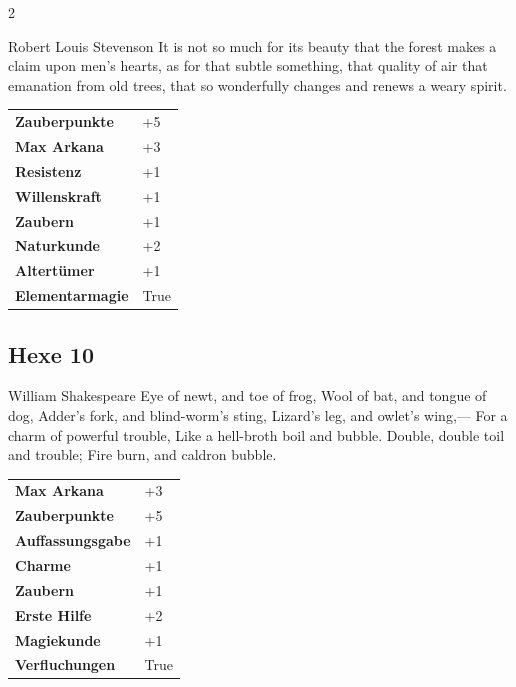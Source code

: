 \begin{multicols}{2}
\begin{tcolorbox}
\begin{pquote}{Robert Louis Stevenson}
It is not so much for its beauty that the forest makes a claim upon men’s hearts, as for that subtle something, that quality of air that emanation from old trees, that so wonderfully changes and renews a weary spirit.
\end{pquote}

\vspace{3mm}

\begin{tabular}{@{}ll@{}}
    \textbf{Zauberpunkte} & +5\\
    \textbf{Max Arkana} & +3\\
    \textbf{Resistenz} & +1\\
    \textbf{Willenskraft} & +1\\
    \textbf{Zaubern} & +1\\
    \textbf{Naturkunde} & +2\\
    \textbf{Altertümer} & +1\\
    \textbf{Elementarmagie} & True\\
\end{tabular}


\end{tcolorbox}

\begin{tcolorbox}
    \subsection*{Hexe \hfill \small{10 }}
    \tcblower


\begin{pquote}{William Shakespeare}
Eye of newt, and toe of frog,
Wool of bat, and tongue of dog,
Adder's fork, and blind-worm's sting,
Lizard's leg, and owlet's wing,—
For a charm of powerful trouble,
Like a hell-broth boil and bubble.
Double, double toil and trouble;
Fire burn, and caldron bubble.
\end{pquote}

\vspace{3mm}

\begin{tabular}{@{}ll@{}}
    \textbf{Max Arkana} & +3\\
    \textbf{Zauberpunkte} & +5\\
    \textbf{Auffassungsgabe} & +1\\
    \textbf{Charme} & +1\\
    \textbf{Zaubern} & +1\\
    \textbf{Erste Hilfe} & +2\\
    \textbf{Magiekunde} & +1\\
    \textbf{Verfluchungen} & True\\
\end{tabular}


\end{tcolorbox}
\end{multicols}
